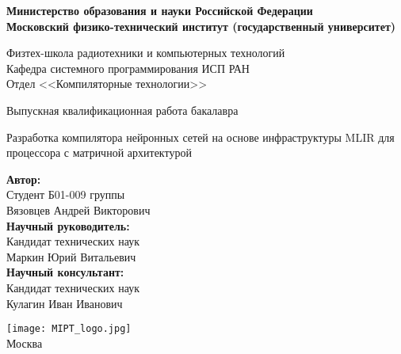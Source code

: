 \begin{center}
    \large\textbf{Министерство образования и науки Российской Федерации \\
    Московский физико-технический институт (государственный
    университет)} \\
    \vspace{1cm}

    Физтех-школа радиотехники и компьютерных технологий \\

    Кафедра системного программирования ИСП РАН \\
    Отдел <<Компиляторные технологии>>\\

    \vspace{3em}

    Выпускная квалификационная работа бакалавра
\end{center}

\begin{center}
    \vspace{\fill}
    \LARGE{Разработка компилятора нейронных сетей на основе инфраструктуры MLIR для процессора с матричной архитектурой}

    \vspace{\fill}
\end{center}


\begin{flushright}
    \textbf{Автор:} \\
    Студент Б01-009 группы \\
    Вязовцев Андрей Викторович \\
    \vspace{2em}
    \textbf{Научный руководитель:} \\
    Кандидат технических наук \\
    Маркин Юрий Витальевич \\
    \vspace{2em}
    \textbf{Научный консультант:} \\
    Кандидат технических наук \\
    Кулагин Иван Иванович \\
\end{flushright}

\vspace{7em}

\begin{center}
    \texttt{[image: MIPT\_logo.jpg]}\\
    Москва \the\year{}
\end{center}

\thispagestyle{empty}

\newpage
\setcounter{page}{2}
\fancyfoot[c]{\thepage}
\fancyhead[R]{}